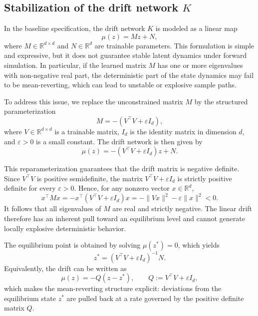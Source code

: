 

\subsection{Stabilization of the drift network $K$}

In the baseline specification, the drift network $K$ is modeled as a linear map
\begin{equation}
\mu(z)=Mz+N,
\label{eq:k_baseline}
\end{equation}
where $M \in \mathbb{R}^{d \times d}$ and $N \in \mathbb{R}^d$ are trainable parameters.
This formulation is simple and expressive, but it does not guarantee stable latent
dynamics under forward simulation. In particular, if the learned matrix $M$ has one or
more eigenvalues with non-negative real part, the deterministic part of the state
dynamics may fail to be mean-reverting, which can lead to unstable or explosive sample
paths.

To address this issue, we replace the unconstrained matrix $M$ by the structured
parameterization
\begin{equation}
M = -\left(V^\top V + \varepsilon I_d\right),
\label{eq:k_stable_matrix}
\end{equation}
where $V \in \mathbb{R}^{d \times d}$ is a trainable matrix, $I_d$ is the identity matrix
in dimension $d$, and $\varepsilon > 0$ is a small constant. The drift network is then
given by
\begin{equation}
\mu(z)= -\left(V^\top V + \varepsilon I_d\right)z + N.
\label{eq:k_stable_drift}
\end{equation}

This reparameterization guarantees that the drift matrix is negative definite. Since
$V^\top V$ is positive semidefinite, the matrix $V^\top V + \varepsilon I_d$ is strictly
positive definite for every $\varepsilon > 0$. Hence, for any nonzero vector
$x \in \mathbb{R}^d$,
\begin{equation}
x^\top M x
=
- x^\top \left(V^\top V + \varepsilon I_d\right)x
=
-\|Vx\|^2 - \varepsilon \|x\|^2
< 0.
\end{equation}
It follows that all eigenvalues of $M$ are real and strictly negative. The linear drift
therefore has an inherent pull toward an equilibrium level and cannot generate locally
explosive deterministic behavior.

The equilibrium point is obtained by solving $\mu(z^\ast)=0$, which yields
\begin{equation}
z^\ast = \left(V^\top V + \varepsilon I_d\right)^{-1}N.
\end{equation}
Equivalently, the drift can be written as
\begin{equation}
\mu(z)=-Q(z-z^\ast),
\qquad
Q:=V^\top V+\varepsilon I_d,
\end{equation}
which makes the mean-reverting structure explicit: deviations from the equilibrium state
$z^\ast$ are pulled back at a rate governed by the positive definite matrix $Q$.

